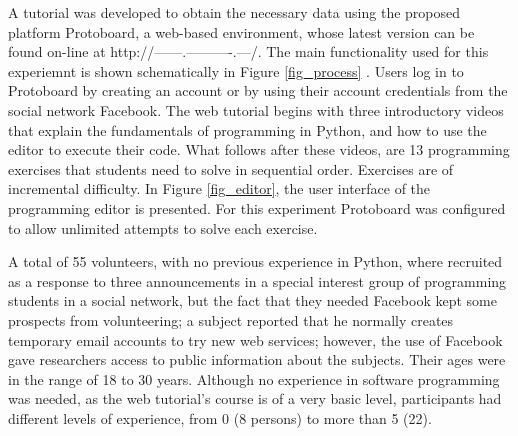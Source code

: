 \documentclass[a4paper]{llncs}
\begin{document}
A tutorial was developed to
obtain the necessary data using the proposed platform Protoboard, a web-based environment,
whose latest version can be found on-line at 
http://------.----------.---/. 
The main functionality  used for this experiemnt is
shown schematically in Figure \ref{fig_process} . %
Users log in to 
Protoboard  by creating an account or by using their account credentials from the
social network Facebook. The web tutorial begins with three introductory videos that explain
the fundamentals of programming in Python, and how to use the editor to
execute their code. What follows after these videos, are 13 programming
exercises that students need to solve in sequential order. Exercises are of
incremental difficulty. In Figure \ref{fig_editor}, %
the user interface of the programming editor is
presented. For this experiment Protoboard was configured to allow unlimited
attempts to solve each exercise. 

A total of 55 volunteers, with no previous experience in Python, where recruited
as a response to three announcements in a special interest group of programming
students in a social network, but the fact that they needed Facebook kept some prospects from
volunteering; a subject reported that he normally creates temporary email
accounts to try new web services; however, the use of Facebook gave researchers access to public
information about the subjects. Their ages were in the range of 18 to
30 years. Although no experience in software programming was needed, as the
web tutorial's course is of a very basic level, participants had
different levels of experience, from 0 (8 persons) to more than 5 (22).

\end{document}
